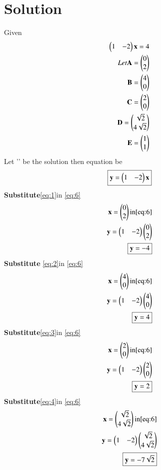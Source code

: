 \documentclass[journal,12pt,twocolumn]{IEEEtran}
\begin{document}
\section{Solution}
Given 
\begin{align}
\begin{pmatrix}1&-2\end{pmatrix}\mathbf{x}=4\\
Let 
\mathbf{A}=\begin{pmatrix}0\\2\end{pmatrix}\label{eq:1} \\
\mathbf{B}=\begin{pmatrix}4\\0\end{pmatrix}\label{eq:2} \\
\mathbf{C}=\begin{pmatrix}2\\0\end{pmatrix} \label{eq:3}\\
\mathbf{D}=\begin{pmatrix}\sqrt{2}\\4\sqrt{2}\end{pmatrix}\label{eq:4} \\
\mathbf{E}=\begin{pmatrix}1\\1\end{pmatrix}\label{eq:5}
\end{align}
Let '' be the solution then equation be 
\begin{equation} \label{eq:6}
\boxed{\mathbf{y}=\begin{pmatrix}1&-2\end{pmatrix}\mathbf{x}}
\end{equation}
\textbf{Substitute}\eqref{eq:1}in \eqref{eq:6}
\begin{align}
 \mathbf{x}=\begin{pmatrix}0\\2\end{pmatrix}\text{in} \eqref{eq:6}\\
          \mathbf{y}=\begin{pmatrix}1&-2\end{pmatrix}\begin{pmatrix}0\\2\end{pmatrix}\\
          \boxed{\mathbf{y}=-4}
\end{align}
\textbf{Substitute }\eqref{eq:2}in \eqref{eq:6}
\begin{align}
\mathbf{x}=\begin{pmatrix}4\\0\end{pmatrix}\text{in} \eqref{eq:6}\\
          \mathbf{y}=\begin{pmatrix}1&-2\end{pmatrix}\begin{pmatrix}4\\0\end{pmatrix}\\
          \boxed{\mathbf{y}=4}
\end{align}
\textbf{Substitute}\eqref{eq:3}in \eqref{eq:6}
\begin{align}
 \mathbf{x}=\begin{pmatrix}2\\0\end{pmatrix}\text{in} \eqref{eq:6}\\
          \mathbf{y}=\begin{pmatrix}1&-2\end{pmatrix}\begin{pmatrix}2\\0\end{pmatrix}\\
          \boxed{\mathbf{y}=2}   
\end{align}
\textbf{Substitute}\eqref{eq:4}in \eqref{eq:6}
\begin{align}
\mathbf{x}=\begin{pmatrix}\sqrt{2}\\4\sqrt{2}\end{pmatrix}\text{in} \eqref{eq:6}\\
          \mathbf{y}=\begin{pmatrix}1&-2\end{pmatrix}\begin{pmatrix}\sqrt{2}\\4\sqrt{2}\end{pmatrix}\\
          \boxed{\mathbf{y}=-7\sqrt{2}}    
\end{align}
\end{document}
